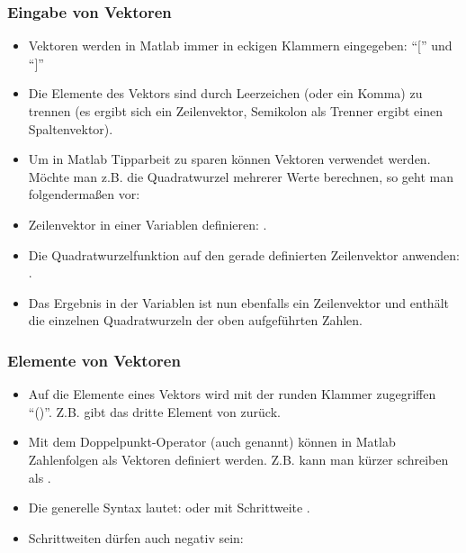     \begin{frame}
      \frametitle{Eingabe von Vektoren}

      \vspace{-0.5cm}

      \begin{itemize}
          \item Vektoren werden in Matlab immer in eckigen Klammern eingegeben: ``['' und ``]''
          \item Die Elemente des Vektors sind durch Leerzeichen (oder ein Komma) zu trennen
          (es ergibt sich ein Zeilenvektor, Semikolon als Trenner ergibt einen Spaltenvektor).
          \item Um in Matlab Tipparbeit zu sparen können Vektoren verwendet werden.
          Möchte man z.B. die Quadratwurzel mehrerer Werte berechnen, so geht man folgendermaßen vor:
          \item Zeilenvektor in einer Variablen definieren: .
          \item Die Quadratwurzelfunktion auf den gerade definierten Zeilenvektor  anwenden: .
          \item Das Ergebnis in der Variablen  ist nun ebenfalls ein Zeilenvektor und enthält die einzelnen
          Quadratwurzeln der oben aufgeführten Zahlen.
      \end{itemize}
    \end{frame}

    \begin{frame}
      \frametitle{Elemente von Vektoren}
      \begin{itemize}
          \item Auf die Elemente eines Vektors wird mit der runden Klammer zugegriffen ``()''. Z.B. 
          gibt das dritte Element von  zurück.
          \item Mit dem Doppelpunkt-Operator \matlabInput{:} (auch  genannt) können in Matlab Zahlenfolgen als Vektoren definiert werden. Z.B. kann man
           kürzer schreiben als .
          \item Die generelle Syntax lautet:  oder  mit Schrittweite .
          \item Schrittweiten dürfen auch negativ sein: 
      \end{itemize}
    \end{frame}


